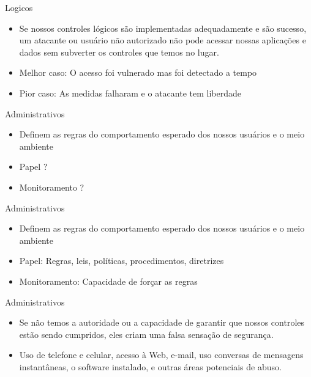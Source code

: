 \documentclass{beamer}
\begin{document}
\begin{frame}{Logicos}
\begin{itemize}
\item Se nossos controles lógicos são implementadas adequadamente e são sucesso, um atacante ou usuário não autorizado não pode acessar nossas aplicações e dados sem subverter os controles que temos no lugar.
\item Melhor caso: O acesso foi vulnerado mas foi detectado a tempo
\item Pior caso: As medidas falharam e o atacante tem liberdade
\end{itemize}
\end{frame}

\begin{frame}{Administrativos}
\begin{itemize}
\item Definem as regras do comportamento esperado dos nossos usuários e o meio ambiente
\item Papel ?
\item Monitoramento ?
\end{itemize}
\end{frame}

\begin{frame}{Administrativos}
\begin{itemize}
\item Definem as regras do comportamento esperado dos nossos usuários e o meio ambiente
\item Papel: Regras, leis, políticas, procedimentos, diretrizes
\item Monitoramento: Capacidade de forçar as regras
\end{itemize}
\end{frame}

\begin{frame}{Administrativos}
\begin{itemize}
\item Se não temos a autoridade ou a capacidade de garantir que nossos controles estão sendo cumpridos, eles criam uma falsa sensação de segurança.
\item Uso de telefone e celular, acesso à Web, e-mail, uso conversas de mensagens instantâneas, o software instalado, e outras áreas potenciais de abuso.
\end{itemize}
\end{frame}
\end{document}
